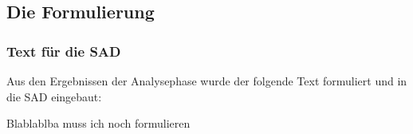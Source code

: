 \subsection{Die Formulierung}
\begin{frame} %
  \frametitle{Text für die SAD} %

  Aus den Ergebnissen der Analysephase wurde der folgende Text formuliert und in die SAD eingebaut:

  \begin{block}{}
	Blablablba muss ich noch formulieren
  \end{block}

\end{frame}